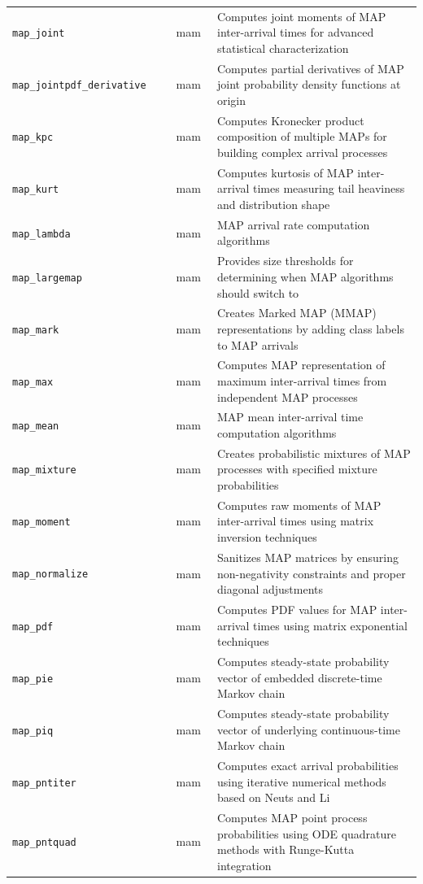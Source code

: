 \begin{footnotesize}
\begin{longtable}{|p{0.4\linewidth}|p{0.1\linewidth}|p{0.5\linewidth}|}
\texttt{map\_joint} & mam & Computes joint moments of MAP inter-arrival times for advanced statistical characterization\\
\texttt{map\_jointpdf\_derivative} & mam & Computes partial derivatives of MAP joint probability density functions at origin\\
\texttt{map\_kpc} & mam & Computes Kronecker product composition of multiple MAPs for building complex arrival processes\\
\texttt{map\_kurt} & mam & Computes kurtosis of MAP inter-arrival times measuring tail heaviness and distribution shape\\
\texttt{map\_lambda} & mam & MAP arrival rate computation algorithms\\
\texttt{map\_largemap} & mam & Provides size thresholds for determining when MAP algorithms should switch to\\
\texttt{map\_mark} & mam & Creates Marked MAP (MMAP) representations by adding class labels to MAP arrivals\\
\texttt{map\_max} & mam & Computes MAP representation of maximum inter-arrival times from independent MAP processes\\
\texttt{map\_mean} & mam & MAP mean inter-arrival time computation algorithms\\
\texttt{map\_mixture} & mam & Creates probabilistic mixtures of MAP processes with specified mixture probabilities\\
\texttt{map\_moment} & mam & Computes raw moments of MAP inter-arrival times using matrix inversion techniques\\
\texttt{map\_normalize} & mam & Sanitizes MAP matrices by ensuring non-negativity constraints and proper diagonal adjustments\\
\texttt{map\_pdf} & mam & Computes PDF values for MAP inter-arrival times using matrix exponential techniques\\
\texttt{map\_pie} & mam & Computes steady-state probability vector of embedded discrete-time Markov chain\\
\texttt{map\_piq} & mam & Computes steady-state probability vector of underlying continuous-time Markov chain\\
\texttt{map\_pntiter} & mam & Computes exact arrival probabilities using iterative numerical methods based on Neuts and Li\\
\texttt{map\_pntquad} & mam & Computes MAP point process probabilities using ODE quadrature methods with Runge-Kutta integration\\

\end{longtable}
\end{footnotesize}
